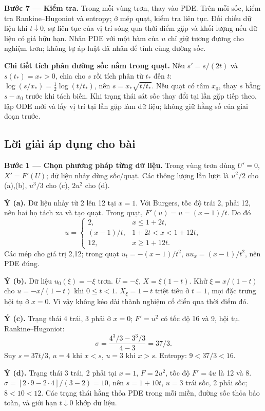 \documentclass[10pt,a4paper]{article}
\begin{document}
\textbf{Bước 7 — Kiểm tra.} Trong mỗi vùng trơn, thay vào PDE. Trên mỗi sốc, kiểm tra Rankine–Hugoniot và entropy; ở mép quạt, kiểm tra liên tục. Đối chiếu dữ liệu khi $t\downarrow0$, sự liên tục của vị trí sóng qua thời điểm gặp và khối lượng nếu dữ liệu có giá hữu hạn. Nhân PDE với một hàm của $u$ chỉ giữ tương đương cho nghiệm trơn; không tự áp luật đã nhân để tính cùng đường sốc.

\textbf{Chi tiết tích phân đường sốc nằm trong quạt.} Nếu $s'=s/(2t)$ và $s(t_*)=x_*>0$, chia cho $s$ rồi tích phân từ $t_*$ đến $t$: $\log(s/x_*)=\frac12\log(t/t_*)$, nên $s=x_*\sqrt{t/t_*}$. Nếu quạt có tâm $x_0$, thay $s$ bằng $s-x_0$ trước khi tách biến. Khi trạng thái sát sốc thay đổi tại lần gặp tiếp theo, lập ODE mới và lấy vị trí tại lần gặp làm dữ liệu; không giữ hằng số của giai đoạn trước.
\subsection*{Lời giải áp dụng cho bài}
\textbf{Bước 1 — Chọn phương pháp từng dữ liệu.} Trong vùng trơn dùng $U'=0$, $X'=F'(U)$; dữ liệu nhảy dùng sốc/quạt. Các thông lượng lần lượt là $u^2/2$ cho (a),(b), $u^3/3$ cho (c), $2u^2$ cho (d).

\textbf{Ý (a).} Dữ liệu nhảy từ 2 lên 12 tại $x=1$. Với Burgers, tốc độ trái 2, phải 12, nên hai họ tách xa và tạo quạt. Trong quạt, $F'(u)=u=(x-1)/t$. Do đó
\[u=\begin{cases}2,&x\le1+2t,\\(x-1)/t,&1+2t<x<1+12t,\\12,&x\ge1+12t.\end{cases}\]
Các mép cho giá trị 2,12; trong quạt $u_t=-(x-1)/t^2$, $uu_x=(x-1)/t^2$, nên PDE đúng.

\textbf{Ý (b).} Dữ liệu $u_0(\xi)=-\xi$ trơn. $U=-\xi$, $X=\xi(1-t)$. Khử $\xi=x/(1-t)$ cho $u=-x/(1-t)$ khi $0\le t<1$. $X_\xi=1-t$ triệt tiêu ở $t=1$, mọi đặc trưng hội tụ ở $x=0$. Vì vậy không kéo dài thành nghiệm cổ điển qua thời điểm đó.

\textbf{Ý (c).} Trạng thái 4 trái, 3 phải ở $x=0$; $F'=u^2$ có tốc độ 16 và 9, hội tụ. Rankine–Hugoniot:
\[\sigma=\frac{4^3/3-3^3/3}{4-3}=37/3.\]
Suy $s=37t/3$, $u=4$ khi $x<s$, $u=3$ khi $x>s$. Entropy: $9<37/3<16$.

\textbf{Ý (d).} Trạng thái 3 trái, 2 phải tại $x=1$, $F=2u^2$, tốc độ $F'=4u$ là 12 và 8. $\sigma=[2\cdot9-2\cdot4]/(3-2)=10$, nên $s=1+10t$, $u=3$ trái sốc, 2 phải sốc; $8<10<12$. Các trạng thái hằng thỏa PDE trong mỗi miền, đường sốc thỏa bảo toàn, và giới hạn $t\downarrow0$ khớp dữ liệu.
\end{document}
